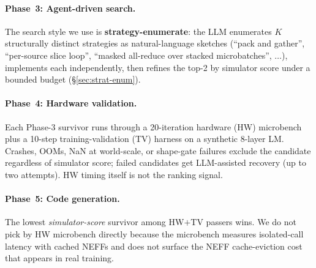 \paragraph{Phase~3: Agent-driven search.}
The search style we use is \textbf{strategy-enumerate}: the LLM
enumerates $K$ structurally distinct strategies as
natural-language sketches (``pack and gather'', ``per-source
slice loop'', ``masked all-reduce over stacked microbatches'',
$\ldots$), implements each independently, then refines the top-2
by simulator score under a bounded budget
(\S\ref{sec:strat-enum}).

\paragraph{Phase~4: Hardware validation.}
Each Phase-3 survivor runs through a 20-iteration hardware (HW)
microbench plus a 10-step training-validation (TV) harness on a
synthetic 8-layer LM. Crashes, OOMs, NaN at world-scale, or
shape-gate failures exclude the candidate regardless of simulator
score; failed candidates get LLM-assisted recovery (up to two
attempts). HW timing itself is not the ranking signal.

\paragraph{Phase~5: Code generation.}
The lowest \emph{simulator-score} survivor among HW$+$TV passers
wins. We do not pick by HW microbench directly because the
microbench measures isolated-call latency with cached NEFFs and
does not surface the NEFF cache-eviction cost that appears in
real training.

